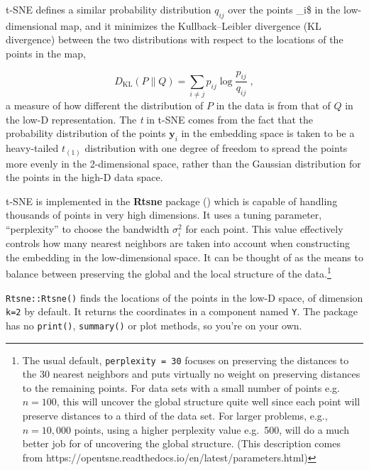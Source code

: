\documentclass[
  letterpaper,
  10pt,
  krantz2]{krantz}
\begin{document}
{t-SNE defines a similar probability distribution \(q_{ij}\) over the
points \_i\$ in the low-dimensional map, and it minimizes the
Kullback--Leibler divergence (KL divergence) between the two
distributions with respect to the locations of the points in the map,

\[
D_\mathrm{KL}\left(P \parallel Q\right) = \sum_{i \neq j} p_{ij} \log \frac{p_{ij}}{q_{ij}} \; ,
\] a measure of how different the distribution of \(P\) in the data is
from that of \(Q\) in the low-D representation. The \emph{t} in t-SNE
comes from the fact that the probability distribution of the points
\(\mathbf{y}_i\) in the embedding space is taken to be a heavy-tailed
\(t_{(1)}\) distribution with one degree of freedom to spread the points
more evenly in the 2-dimensional space, rather than the Gaussian
distribution for the points in the high-D data space.

t-SNE is implemented in the \textbf{Rtsne} package
() which is capable of handling
thousands of points in very high dimensions. It uses a tuning parameter,
``perplexity'' to choose the bandwidth \(\sigma^2_i\) for each point.
This value effectively controls how many nearest neighbors are taken
into account when constructing the embedding in the low-dimensional
space. It can be thought of as the means to balance between preserving
the global and the local structure of the data.\footnote{The usual
  default, \texttt{perplexity\ =\ 30} focuses on preserving the
  distances to the 30 nearest neighbors and puts virtually no weight on
  preserving distances to the remaining points. For data sets with a
  small number of points e.g.~\(n=100\), this will uncover the global
  structure quite well since each point will preserve distances to a
  third of the data set. For larger problems, e.g., \(n = 10,000\)
  points, using a higher perplexity value e.g.~500, will do a much
  better job for of uncovering the global structure. (This description
  comes from https://opentsne.readthedocs.io/en/latest/parameters.html)}

\texttt{Rtsne::Rtsne()} finds the locations of the points in the low-D
space, of dimension \texttt{k=2} by default. It returns the coordinates
in a component named \texttt{Y}. The package has no \texttt{print()},
\texttt{summary()} or plot methods, so you're on your own.

}
\end{document}
